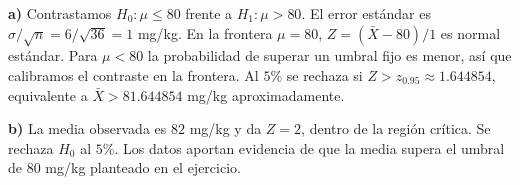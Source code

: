 \textbf{a)} Contrastamos $H_0:\mu\le80$ frente a $H_1:\mu>80$.
El error estándar es $\sigma/\sqrt n=6/\sqrt{36}=1$ mg/kg.
En la frontera $\mu=80$, $Z=(\bar X-80)/1$ es normal estándar.
Para $\mu<80$ la probabilidad de superar un umbral fijo
es menor, así que calibramos el contraste en la frontera.
Al $5\%$ se rechaza si $Z>z_{0.95}\approx1.644854$,
equivalente a $\bar X>81.644854$ mg/kg aproximadamente.

\textbf{b)} La media observada es $82$ mg/kg y da $Z=2$,
dentro de la región crítica. Se rechaza $H_0$ al $5\%$.
Los datos aportan evidencia de que la media supera el umbral
de 80 mg/kg planteado en el ejercicio.
